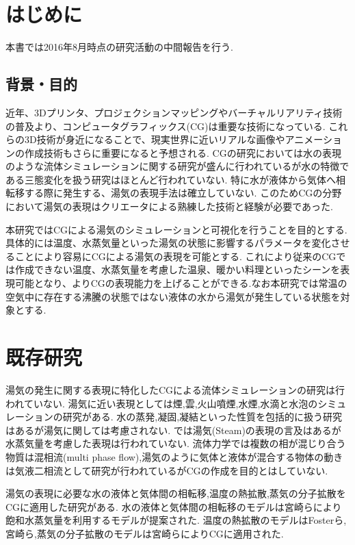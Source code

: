 \section{はじめに}
本書では2016年8月時点の研究活動の中間報告を行う.

\subsection{背景・目的}
近年、3Dプリンタ、プロジェクションマッピングやバーチャルリアリティ技術の普及より、コンピュータグラフィックス(CG)は重要な技術になっている.
これらの3D技術が身近になることで、現実世界に近いリアルな画像やアニメーションの作成技術もさらに重要になると予想される. CGの研究においては水の表現のような流体シミュレーションに関する研究が盛んに行われているが水の特徴である三態変化を扱う研究はほとんど行われていない.
特に水が液体から気体へ相転移する際に発生する、湯気の表現手法は確立していない.
このためCGの分野において湯気の表現はクリエータによる熟練した技術と経験が必要であった.

本研究ではCGによる湯気のシミュレーションと可視化を行うことを目的とする.
具体的には温度、水蒸気量といった湯気の状態に影響するパラメータを変化させることにより容易にCGによる湯気の表現を可能とする.
これにより従来のCGでは作成できない温度、水蒸気量を考慮した温泉、暖かい料理といったシーンを表現可能となり、よりCGの表現能力を上げることができる.なお本研究では常温の空気中に存在する沸騰の状態ではない液体の水から湯気が発生している状態を対象とする.

\section{既存研究}

湯気の発生に関する表現に特化したCGによる流体シミュレーションの研究は行われていない.
湯気に近い表現としては煙\cite{Fedkiw2001},雲\cite{Dobashi2000}\cite{Miyazaki2001}\cite{Miyazaki2002},火山噴煙\cite{Mizuno2003}\cite{Mizuno2004},水煙\cite{Nielsen2013},水滴と水泡\cite{Mihalef2009}のシミュレーションの研究がある.
水の蒸発,凝固,凝結といった性質を包括的に扱う研究\cite{Fujisawa2008}はあるが湯気に関しては考慮されない.
\cite{Foster1997}では湯気(Steam)の表現の言及はあるが水蒸気量を考慮した表現は行われていない.
流体力学では複数の相が混じり合う物質は混相流(multi phase flow),湯気のように気体と液体が混合する物体の動きは気液二相流として研究が行われているがCGの作成を目的とはしていない.

湯気の表現に必要な水の液体と気体間の相転移,温度の熱拡散,蒸気の分子拡散をCGに適用した研究がある.
水の液体と気体間の相転移のモデルは宮崎ら\cite{Miyazaki2001}\cite{Miyazaki2002}により飽和水蒸気量を利用するモデルが提案された.
温度の熱拡散のモデルはFosterら\cite{Foster1997},宮崎ら\cite{Miyazaki2002},蒸気の分子拡散のモデルは宮崎ら\cite{Miyazaki2002}によりCGに適用された.

